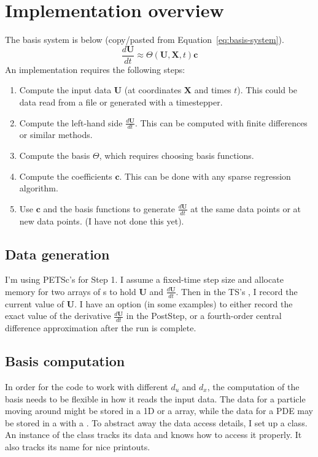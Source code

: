 \documentclass{article}
\let\vec\mathbf
\def\lstinline#1{}%
\begin{document}
\section{Implementation overview}

The basis system is below (copy/pasted from Equation~\ref{eq:basis-system}).
\begin{equation}
\frac{d\vec{U}}{dt} \approx \Theta(\vec{U}, \vec{X}, t) \vec{c}
\end{equation}
An implementation requires the following steps:
\begin{enumerate}
    \item Compute the input data $\vec{U}$ (at coordinates $\vec{X}$ and times $t$). This could be data read from a file or generated with a timestepper.
    \item Compute the left-hand side $\frac{d\vec{U}}{dt}$. This can be computed with finite differences or similar methods.
    \item Compute the basis $\Theta$, which requires choosing basis functions.
    \item Compute the coefficients $\vec{c}$. This can be done with any sparse regression algorithm.
    \item Use $\vec{c}$ and the basis functions to generate $\frac{d\vec{U}}{dt}$ at the same data points or at new data points. (I have not done this yet).
\end{enumerate}

\subsection{Data generation}

I'm using PETSc's \lstinline{TS} for Step 1. I assume a fixed-time step size and
allocate memory for two arrays of \lstinline{Vec}s to hold $\vec{U}$ and
$\frac{d\vec{U}}{dt}$. Then in the TS's \lstinline{PostStep}, I record the
current value of $\vec{U}$. I have an option (in some examples) to either record
the exact value of the derivative $\frac{d\vec{U}}{dt}$ in the PostStep, or a
fourth-order central difference approximation after the run is complete.


\subsection{Basis computation}

In order for the code to work with different $d_u$ and $d_x$, the computation of
the basis needs to be flexible in how it reads the input data. The data
for a particle moving around might be stored in a 1D \lstinline{Vec} or a
\lstinline{PetscScalar} array, while the data for a PDE may be stored in a
\lstinline{Vec} with a \lstinline{DMDA}. To abstract away the data access
details, I set up a \lstinline{Variable} class. An instance of the class tracks
its data and knows how to access it properly. It also tracks its name for nice
printouts.
\end{document}
